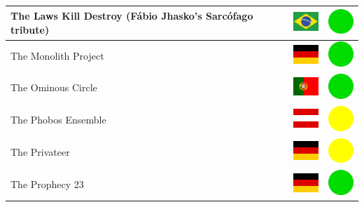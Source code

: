 \documentclass[12pt, a4paper, twoside]{report}
\begin{document}
\begin{center}
\begin{longtable}{|p{5cm}|p{2cm}|p{2cm}|}
The Laws Kill Destroy (Fábio Jhasko's Sarcófago tribute) & \includegraphics[width=1cm]{4x3/br} & \includegraphics[width=1cm]{likes/y} \\ \hline
The Monolith Project & \includegraphics[width=1cm]{4x3/de} & \includegraphics[width=1cm]{likes/y} \\ \hline
The Ominous Circle & \includegraphics[width=1cm]{4x3/pt} & \includegraphics[width=1cm]{likes/y} \\ \hline
The Phobos Ensemble & \includegraphics[width=1cm]{4x3/at} & \includegraphics[width=1cm]{likes/m} \\ \hline
The Privateer & \includegraphics[width=1cm]{4x3/de} & \includegraphics[width=1cm]{likes/m} \\ \hline
The Prophecy 23 & \includegraphics[width=1cm]{4x3/de} & \includegraphics[width=1cm]{likes/y} \\ \hline

\end{longtable}
\end{center}
\end{document}
